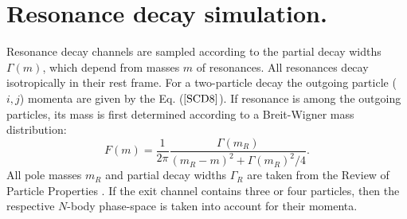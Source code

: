 \section{Resonance decay simulation.} 

\hspace{1.0em}Resonance decay channels are sampled according to the partial decay widths 
$\Gamma(m)$, 
which depend from masses $m$ of resonances.
All resonances decay isotropically in their rest
frame. For a two-particle decay the outgoing particle ($i,j$) momenta are given
by the Eq. ($\ref{SCD8}$). 
 If resonance is among the outgoing particles,
its mass is first determined according to a Breit-Wigner mass
distribution:
\begin{equation}
\label{DS2} F(m) = 
\frac{1}{2\pi}\frac{\Gamma(m_R)}{(m_R - m)^2 + \Gamma(m_R)^2/4}.
\end{equation}
  All pole masses $m_R$ and partial
decay widths $\Gamma_R$ are taken from the Review of Particle Properties
\cite{PDG96}.
 If the exit channel contains three or four particles, then
the respective $N$-body phase-space is taken into account for their
momenta.
